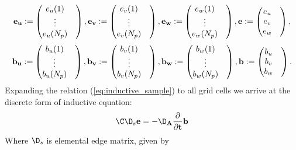\begin{equation*}
\bf{e}_{u}:=
\begin{pmatrix}
e_{u}(1)&\\
\vdots&\\
e_{u}(N_{p})&
\end{pmatrix},
\bf{e}_{v}:=
\begin{pmatrix}
e_{v}(1)&\\
\vdots&\\
e_{v}(N_{p})&
\end{pmatrix},
\bf{e}_{w}:=
\begin{pmatrix}
e_{w}(1)&\\
\vdots&\\
e_{w}(N_{p})&
\end{pmatrix},
\bf{e}:=
\begin{pmatrix}
e_{u}&\\
e_{v}&\\
e_{w}&
\end{pmatrix},
\label{eq:vector_e_field}
\end{equation*}
\begin{equation*}
\bf{b}_{u}:=
\begin{pmatrix}
b_{u}(1)&\\
\vdots&\\
b_{u}(N_{p})&
\end{pmatrix},
\bf{b}_{v}:=
\begin{pmatrix}
b_{v}(1)&\\
\vdots&\\
b_{v}(N_{p})&
\end{pmatrix},
\bf{b}_{w}:=
\begin{pmatrix}
b_{w}(1)&\\
\vdots&\\
b_{w}(N_{p})&
\end{pmatrix},
\bf{b}:=
\begin{pmatrix}
b_{u}&\\
b_{v}&\\
b_{w}&
\end{pmatrix}.
\label{eq:vector_m_flux_density}
\end{equation*}
Expanding the relation (\ref{eq:inductive_sample}) to all grid cells \cite{FIT_discrete_method,FIT_discrete_electrommagnetism} we arrive at the discrete form of inductive equation:
\begin{equation}
\C\D_{s}\bf{e}=-\D_{A}\frac{\partial}{\partial{t}}\bf{b}
\label{eq:inductive_sample_all}
\end{equation}
Where $\D_{s}$ is elemental edge matrix, given by
